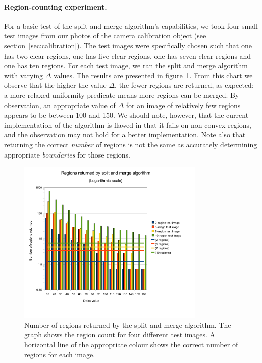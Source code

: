\paragraph{Region-counting experiment.}
For a basic test of the split and merge algorithm's capabilities, we took four small test images from our photos of the camera calibration object (see section~\ref{sec:calibration}). The test images were specifically chosen such that one has two clear regions, one has five clear regions, one has seven clear regions and one has ten regions. For each test image, we ran the split and merge algorithm with varying $\Delta$ values. The results are presented in figure~\ref{fig:region-counts}. From this chart we observe that the higher the value $\Delta$, the fewer regions are returned, as expected: a more relaxed uniformity predicate means more regions can be merged. By observation, an appropriate value of $\Delta$ for an image of relatively few regions appears to be between 100 and 150. We should note, however, that the current implementation of the algorithm is flawed in that it fails on non-convex regions, and the observation may not hold for a better implementation. Note also that returning the correct \emph{number} of regions is not the same as accurately determining appropriate \emph{boundaries} for those regions.

\begin{figure}[h]
  \centering
  \includegraphics[width=0.8\textwidth]{figures/region-counts}
  \caption[Regions returned by split and merge algorithm]{Number of regions returned by the split and merge algorithm. The graph shows the region count for four different test images. A horizontal line of the appropriate colour shows the correct number of regions for each image.}
  \label{fig:region-counts}
\end{figure}
